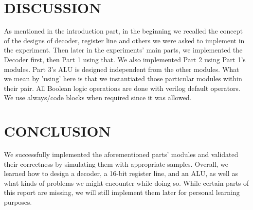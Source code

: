 \documentclass[pdftex,12pt,a4paper]{article}
\begin{document}
\section{DISCUSSION }
As mentioned in the introduction part, in the beginning we recalled the concept of the designs of decoder, register line and others we were asked to implement in the experiment. Then later in the experiments' main parts, we implemented the Decoder first, then Part 1 using that. We also implemented Part 2 using Part 1's modules. Part 3's ALU is designed independent from the other modules. What we mean by 'using' here is that we instantiated those particular modules within their pair. All Boolean logic operations are done with verilog default operators. We use always/code blocks when required since it was allowed. 


\section{CONCLUSION}
We successfully implemented the aforementioned parts' modules and validated their correctness by simulating them with appropriate samples. Overall, we learned how to design a decoder, a 16-bit register line, and an ALU, as well as what kinds of problems we might encounter while doing so. While certain parts of this report are missing, we will still implement them later for personal learning purposes.




\nocite{ref1}
\nocite{overleaf}
\end{document}

